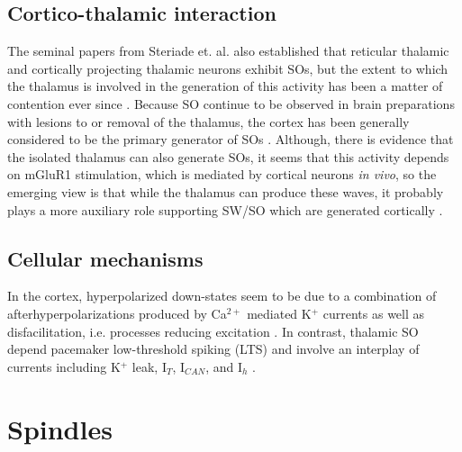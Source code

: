 \subsection*{Cortico-thalamic interaction}
The seminal papers from Steriade et. al. also established that reticular thalamic and cortically projecting thalamic neurons exhibit SOs, but the extent to which the thalamus is involved in the generation of this activity has been a matter of contention ever since \citep{Steriade1993b, Crunelli2010, Crunelli2018}. Because SO continue to be observed in brain preparations with lesions to or removal of the thalamus, the cortex has been generally considered to be the primary generator of SOs \citep{Steriade1993b, Timofeev1996}. Although, there is evidence that the isolated thalamus can also generate SOs, it seems that this activity depends on mGluR1 stimulation, which is mediated by cortical neurons \textit{in vivo}, so the emerging view is that while the thalamus can produce these waves, it probably plays a more auxiliary role supporting SW/SO which are generated cortically \citep{Blethyn2006a, Crunelli2010, Mak-Mccully2017}.

\subsection*{Cellular mechanisms}
In the cortex, hyperpolarized down-states seem to be due to a combination of afterhyperpolarizations produced by Ca$^{2+}$ mediated K$^+$ currents as well as disfacilitation, i.e. processes reducing excitation \citep{Timofeev2001, Buzsaki2012, Mak-Mccully2017}. In contrast, thalamic SO depend pacemaker low-threshold spiking (LTS) and involve an interplay of currents including K$^+$ leak, I$_T$, I$_{CAN}$, and I$_h$  \citep{Hughes2002,Blethyn2006a, Crunelli2018}. 



\section{Spindles}

